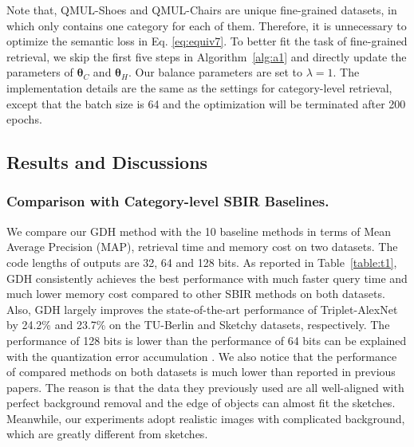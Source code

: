 \documentclass[runningheads]{llncs}
\begin{document}
Note that, QMUL-Shoes and QMUL-Chairs are unique fine-grained datasets, in which only contains one category for each of them. Therefore, it is unnecessary to optimize the semantic loss in Eq. \eqref{eq:equiv7}.  To better fit the task of fine-grained retrieval, we skip the first five steps in Algorithm~\ref{alg:a1} and directly update the parameters of $\bm{\theta}_C$ and $\bm{\theta}_H$. Our balance parameters are set to %
$ \lambda=1$.
The implementation details are the same as the settings for category-level retrieval, except that the batch size is 64 and the optimization
will be terminated after 200 epochs.





\subsection{Results and Discussions}
\vspace{-1ex}
\subsubsection{Comparison with Category-level SBIR Baselines.} We compare our GDH method with the 10 baseline methods in terms of Mean Average Precision (MAP), retrieval time and memory cost on two datasets. The code lengths of outputs are 32, 64 and 128 bits.  As reported in Table~\ref{table:t1}, GDH consistently achieves the best performance with much faster query time and much lower memory cost compared to other SBIR methods on both datasets. Also, GDH largely improves the state-of-the-art performance of Triplet-AlexNet by 24.2\% and 23.7\% on the TU-Berlin and Sketchy datasets, respectively. The performance of 128 bits is lower than the performance of 64 bits can be explained with the quantization error accumulation \cite{shen2015supervised}. We also notice that the performance of compared methods on both datasets is much lower than reported in previous papers\cite{WangKL15,Yu2016shoes}. The reason is that the data they previously used are all well-aligned with perfect background removal and the edge of objects can almost fit the sketches. Meanwhile, our experiments adopt realistic images with complicated background, which are greatly different from sketches.
\end{document}
